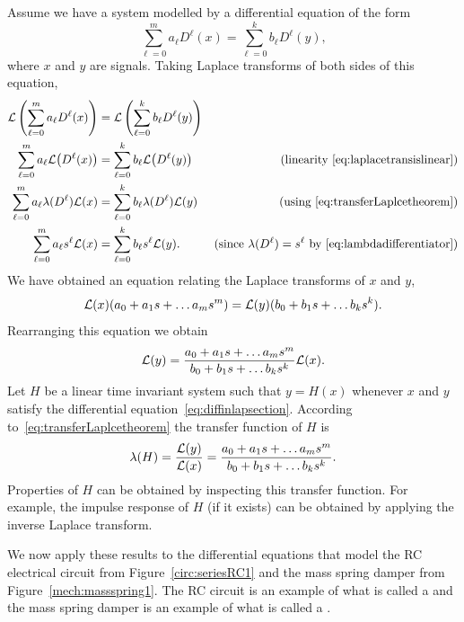 Assume we have a system modelled by a differential equation of the form
\begin{equation}\label{eq:diffinlapsection}
\sum_{\ell=0}^{m} a_\ell D^\ell(x) = \sum_{\ell=0}^{k} b_\ell D^\ell(y),
\end{equation}
where $x$ and $y$ are signals.  Taking Laplace transforms of both sides of this equation,
\begin{align*}
\mathcal L\left( \sum_{\ell=0}^{m} a_\ell D^\ell(x) \right) &= \mathcal L\left( \sum_{\ell=0}^{k} b_\ell D^\ell(y) \right) & \\
\sum_{\ell=0}^{m} a_\ell \mathcal L\big(D^\ell(x)\big) &= \sum_{\ell=0}^{k} b_\ell \mathcal L\big(D^\ell(y)\big) & \text{(linearity~\eqref{eq:laplacetransislinear})} \\
\sum_{\ell=0}^{m} a_\ell \lambda(D^\ell) \mathcal L(x) &= \sum_{\ell=0}^{k} b_\ell \lambda(D^\ell) \mathcal L(y) & \text{(using \eqref{eq:transferLaplcetheorem})} \\
\sum_{\ell=0}^{m} a_\ell s^\ell \mathcal L(x) &= \sum_{\ell=0}^{k} b_\ell s^\ell \mathcal L(y). & \text{(since $\lambda(D^\ell) = s^\ell$ by~\eqref{eq:lambdadifferentiator})}
\end{align*}
We have obtained an equation relating the Laplace transforms of $x$ and $y$,
\[
\mathcal L(x) (a_0 + a_1s + \dots a_m s^m) =  \mathcal L(y) (b_0 + b_1s + \dots b_k s^k). 
\]
Rearranging this equation we obtain 
\[
\mathcal L(y) = \frac{a_0 + a_1s + \dots a_m s^m}{b_0 + b_1s + \dots b_k s^k} \mathcal L(x).
\]
Let $H$ be a linear time invariant system such that $y = H(x)$ whenever $x$ and $y$ satisfy the differential equation~\eqref{eq:diffinlapsection}.   According to~\eqref{eq:transferLaplcetheorem} the transfer function of $H$ is
\[
\lambda(H) = \frac{\mathcal L(y)}{\mathcal L(x)} = \frac{a_0 + a_1s + \dots a_m s^m}{b_0 + b_1s + \dots b_k s^k}.
\]
Properties of $H$ can be obtained by inspecting this transfer function.  For example, the impulse response of $H$ (if it exists) can be obtained by applying the inverse Laplace transform.

We now apply these results to the differential equations that model the RC electrical circuit from Figure~\ref{circ:seriesRC1} and the mass spring damper from Figure~\ref{mech:massspring1}.  The RC circuit is an example of what is called a  and the mass spring damper is an example of what is called a .

